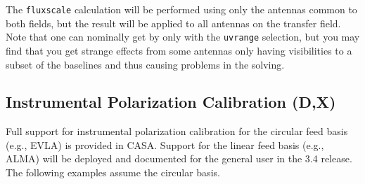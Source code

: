 The {\tt fluxscale} calculation will be performed using only the
antennas common 
to both fields, but the result will be applied to all antennas on the
transfer field.  Note that one can nominally get by only with the
{\tt uvrange} selection, but you may find that you get strange
effects from some antennas only having visibilities to a subset of
the baselines and thus causing problems in the solving.

\subsection{Instrumental Polarization Calibration (D,X)}
\label{section:cal.solve.pol}

Full support for instrumental polarization calibration for the 
circular feed basis (e.g., EVLA) is provided in CASA.  Support for 
the linear feed basis (e.g., ALMA) will be deployed and documented
for the general user in the 3.4 release.  The following examples
assume the circular basis.

